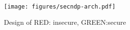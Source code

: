 \begin{figure}[t]
	\centering
	\texttt{[image: figures/secndp-arch.pdf]}
	\caption{\label{fig:secndp-arch} Design of \project RED: insecure, GREEN:secure}
\end{figure}